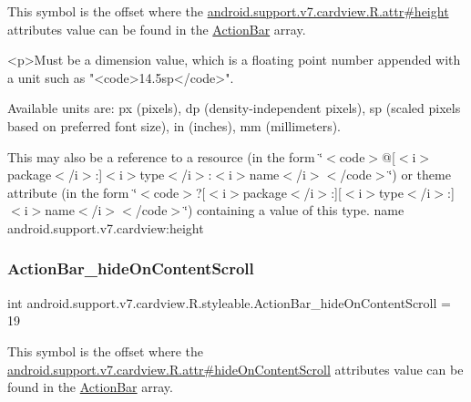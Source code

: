 This symbol is the offset where the \hyperlink{classandroid_1_1support_1_1v7_1_1cardview_1_1R_1_1attr_a52501b26bd9a1de11fdf451397cb630c}{android.\+support.\+v7.\+cardview.\+R.\+attr\#height} attribute\textquotesingle{}s value can be found in the \hyperlink{classandroid_1_1support_1_1v7_1_1cardview_1_1R_1_1styleable_a0cbf7f776e31f78bb0a2b558daf176f8}{Action\+Bar} array.

\begin{DoxyVerb}      <p>Must be a dimension value, which is a floating point number appended with a unit such as "<code>14.5sp</code>".
\end{DoxyVerb}
 Available units are\+: px (pixels), dp (density-\/independent pixels), sp (scaled pixels based on preferred font size), in (inches), mm (millimeters). 

This may also be a reference to a resource (in the form \char`\"{}$<$code$>$@\mbox{[}$<$i$>$package$<$/i$>$\+:\mbox{]}$<$i$>$type$<$/i$>$\+:$<$i$>$name$<$/i$>$$<$/code$>$\char`\"{}) or theme attribute (in the form \char`\"{}$<$code$>$?\mbox{[}$<$i$>$package$<$/i$>$\+:\mbox{]}\mbox{[}$<$i$>$type$<$/i$>$\+:\mbox{]}$<$i$>$name$<$/i$>$$<$/code$>$\char`\"{}) containing a value of this type.  name android.\+support.\+v7.\+cardview\+:height \mbox{\label{classandroid_1_1support_1_1v7_1_1cardview_1_1R_1_1styleable_a32617ba8acd97d7f15aad540e355800d}} 
\subsubsection{\texorpdfstring{Action\+Bar\+\_\+hide\+On\+Content\+Scroll}{ActionBar\_hideOnContentScroll}}
{\footnotesize\ttfamily int android.\+support.\+v7.\+cardview.\+R.\+styleable.\+Action\+Bar\+\_\+hide\+On\+Content\+Scroll = 19\hspace{0.3cm}{\ttfamily [static]}}

This symbol is the offset where the \hyperlink{classandroid_1_1support_1_1v7_1_1cardview_1_1R_1_1attr_a14d559ad97fd45b76bdbb6c0bec8ceca}{android.\+support.\+v7.\+cardview.\+R.\+attr\#hide\+On\+Content\+Scroll} attribute\textquotesingle{}s value can be found in the \hyperlink{classandroid_1_1support_1_1v7_1_1cardview_1_1R_1_1styleable_a0cbf7f776e31f78bb0a2b558daf176f8}{Action\+Bar} array.

